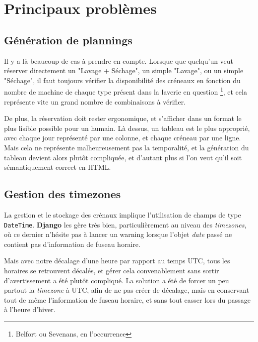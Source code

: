 \documentclass[a4paper]{report}
\begin{document}
\section{Principaux problèmes}
\label{sec:principaux_problemes}

\subsection{Génération de plannings}
\label{sub:generation_de_plannings}
\par Il y a là beaucoup de cas à prendre en compte. Lorsque que quelqu'un veut réserver directement un "Lavage +
Séchage", un simple "Lavage", ou un simple "Séchage", il faut toujours vérifier la disponibilité des créneaux en
fonction du nombre de machine de chaque type présent dans la laverie en question \footnote{Belfort ou Sevenans, en
l'occurrence}, et cela représente vite un grand nombre de combinaisons à vérifier.

\par De plus, la réservation doit rester ergonomique, et s'afficher dans un format le plus lisible possible pour un
humain. Là dessus, un tableau est le plus approprié, avec chaque jour représenté par une colonne, et chaque créneau par
une ligne.\\
Mais cela ne représente malheureusement pas la temporalité, et la génération du tableau devient alors plutôt compliquée,
et d'autant plus si l'on veut qu'il soit sémantiquement correct en HTML.

\subsection{Gestion des timezones}
\label{sub:gestion_des_timezones}
\par La gestion et le stockage des crénaux implique l'utilisation de champs de type \verb#DateTime#. \textbf{Django} les
gère très bien, particulièrement au niveau des \emph{timezones}, où ce dernier n'hésite pas à lancer un warning lorsque
l'objet \emph{date} passé ne contient pas d'information de fuseau horaire.

\par Mais avec notre décalage d'une heure par rapport au temps UTC, tous les horaires se retrouvent décalés, et gérer
cela convenablement sans sortir d'avertissement a été plutôt compliqué. La solution a été de forcer un peu partout la
\emph{timezone} à UTC, afin de ne pas créer de décalage, mais en conservant tout de même l'information de fuseau
horaire, et sans tout casser lors du passage à l'heure d'hiver.
\end{document}
